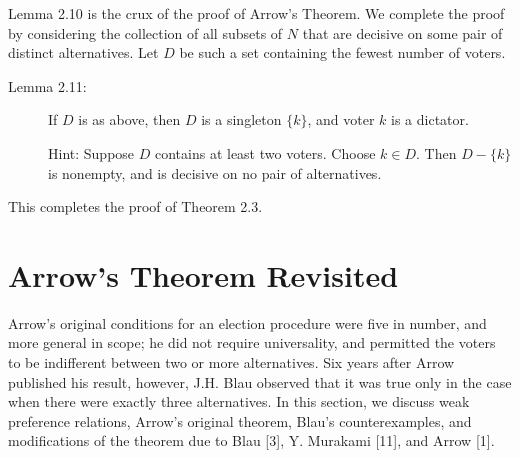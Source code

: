 \documentclass{article}
\begin{document}
Lemma 2.10 is the crux of the proof of Arrow's Theorem. We complete the proof by considering the collection of all subsets of $N$ that are decisive on some pair of distinct alternatives. Let $D$ be such a set containing the fewest number of voters.

\begin{description}

\item[Lemma 2.11:] If $D$ is as above, then $D$ is a singleton $\{ k \}$, and voter $k$ is a dictator.

  Hint: Suppose $D$ contains at least two voters. Choose $k \in D$. Then $D - \{ k \}$ is nonempty, and is decisive on no pair of alternatives.

\end{description}

This completes the proof of Theorem 2.3.



\section{Arrow's Theorem Revisited}

Arrow's original conditions for an election procedure were five in number, and more general in scope; he did not require universality, and permitted the voters to be indifferent between two or more alternatives. Six years after Arrow published his result, however, J.H. Blau observed that it was true only in the case when there were exactly three alternatives. In this section, we discuss weak preference relations, Arrow's original theorem, Blau's counterexamples, and modifications of the theorem due to Blau [3], Y. Murakami [11], and Arrow [1].
\end{document}
